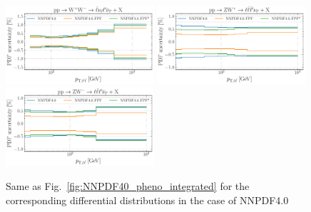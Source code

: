 \begin{figure}[htbp]
\includegraphics[width=0.49\textwidth]{plots/LHCpheno/NNPDF_WPWM_14TEV_40_PHENO-global.pdf}
\includegraphics[width=0.49\textwidth]{plots/LHCpheno/NNPDF_WPZ_14TEV_40_PHENO-global.pdf}
\includegraphics[width=0.49\textwidth]{plots/LHCpheno/NNPDF_WMZ_14TEV_40_PHENO-global.pdf}
\caption{Same as Fig.~\ref{fig:NNPDF40_pheno_integrated}
for the corresponding differential distributions in the case of NNPDF4.0
%
}
\label{fig:NNPDF40_pheno_differential}
\end{figure}

